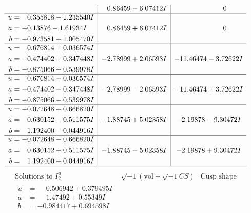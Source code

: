 \documentclass[1p]{elsarticle_modified}
\theoremstyle{definition}
\newcommand{\I}{\sqrt{-1}}
\begin{document}
$$\begin{array}{c|c|c}
 & \phantom{-}0.86459 - 6.07412 I & \phantom{-0.000000 } 0 \\ \hline\begin{aligned}
u &= \phantom{-}0.355818 - 1.235540 I \\
a &= -0.13876 - 1.61934 I \\
b &= -0.973581 + 1.005470 I\end{aligned}
 & \phantom{-}0.86459 + 6.07412 I & \phantom{-0.000000 } 0 \\ \hline\begin{aligned}
u &= \phantom{-}0.676814 + 0.036574 I \\
a &= -0.474402 + 0.347448 I \\
b &= -0.875066 + 0.539978 I\end{aligned}
 & -2.78999 + 2.06593 I & -11.46474 - 3.72622 I \\ \hline\begin{aligned}
u &= \phantom{-}0.676814 - 0.036574 I \\
a &= -0.474402 - 0.347448 I \\
b &= -0.875066 - 0.539978 I\end{aligned}
 & -2.78999 - 2.06593 I & -11.46474 + 3.72622 I \\ \hline\begin{aligned}
u &= -0.072648 + 0.666820 I \\
a &= \phantom{-}0.630152 - 0.511575 I \\
b &= \phantom{-}1.192400 - 0.044916 I\end{aligned}
 & -1.88745 + 5.02358 I & -2.19878 - 9.30472 I \\ \hline\begin{aligned}
u &= -0.072648 - 0.666820 I \\
a &= \phantom{-}0.630152 + 0.511575 I \\
b &= \phantom{-}1.192400 + 0.044916 I\end{aligned}
 & -1.88745 - 5.02358 I & -2.19878 + 9.30472 I\\
 \hline 
 \end{array}$$\newpage$$\begin{array}{c|c|c}  
\text{Solutions to }I^u_{2}& \I (\text{vol} + \sqrt{-1}CS) & \text{Cusp shape}\\
 \hline 
\begin{aligned}
u &= \phantom{-}0.506942 + 0.379495 I \\
a &= \phantom{-}1.47492 + 0.55349 I \\
b &= -0.984417 + 0.694598 I\end{aligned}

\end{array}$$
\end{document}
